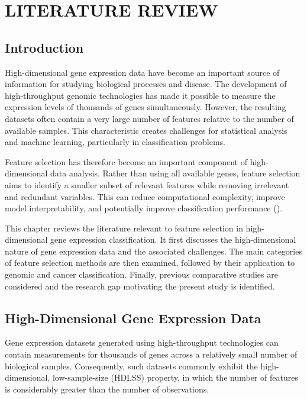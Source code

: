 \chapter{LITERATURE REVIEW}

\section{Introduction}

High-dimensional gene expression data have become an important source of information for studying biological processes and disease. The development of high-throughput genomic technologies has made it possible to measure the expression levels of thousands of genes simultaneously. However, the resulting datasets often contain a very large number of features relative to the number of available samples. This characteristic creates challenges for statistical analysis and machine learning, particularly in classification problems.

Feature selection has therefore become an important component of high-dimensional data analysis. Rather than using all available genes, feature selection aims to identify a smaller subset of relevant features while removing irrelevant and redundant variables. This can reduce computational complexity, improve model interpretability, and potentially improve classification performance (\cite{venkatesh2019review,li2017feature,kumar2014feature}).

This chapter reviews the literature relevant to feature selection in high-dimensional gene expression classification. It first discusses the high-dimensional nature of gene expression data and the associated challenges. The main categories of feature selection methods are then examined, followed by their application to genomic and cancer classification. Finally, previous comparative studies are considered and the research gap motivating the present study is identified.

\section{High-Dimensional Gene Expression Data}

Gene expression datasets generated using high-throughput technologies can contain measurements for thousands of genes across a relatively small number of biological samples. Consequently, such datasets commonly exhibit the high-dimensional, low-sample-size (HDLSS) property, in which the number of features is considerably greater than the number of observations.

